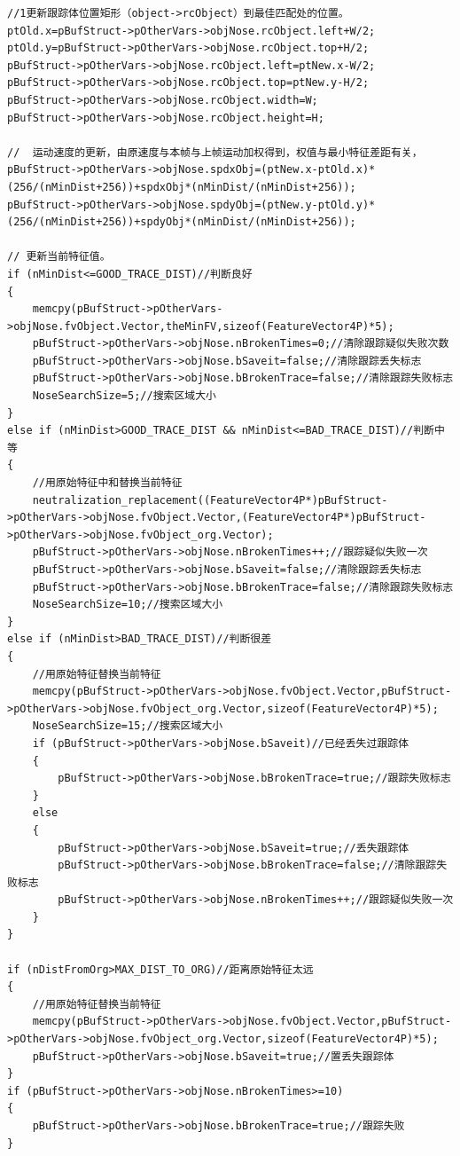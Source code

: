 \documentclass[12pt,hyperref,a4paper,UTF8]{ctexart}
\begin{document}
        \begin{lstlisting}[caption={更新}, label={lst:example}]
//1更新跟踪体位置矩形（object->rcObject）到最佳匹配处的位置。
ptOld.x=pBufStruct->pOtherVars->objNose.rcObject.left+W/2;
ptOld.y=pBufStruct->pOtherVars->objNose.rcObject.top+H/2;
pBufStruct->pOtherVars->objNose.rcObject.left=ptNew.x-W/2;
pBufStruct->pOtherVars->objNose.rcObject.top=ptNew.y-H/2;
pBufStruct->pOtherVars->objNose.rcObject.width=W;
pBufStruct->pOtherVars->objNose.rcObject.height=H;

// 	运动速度的更新，由原速度与本帧与上帧运动加权得到，权值与最小特征差距有关，
pBufStruct->pOtherVars->objNose.spdxObj=(ptNew.x-ptOld.x)*(256/(nMinDist+256))+spdxObj*(nMinDist/(nMinDist+256));
pBufStruct->pOtherVars->objNose.spdyObj=(ptNew.y-ptOld.y)*(256/(nMinDist+256))+spdyObj*(nMinDist/(nMinDist+256));

// 更新当前特征值。
if (nMinDist<=GOOD_TRACE_DIST)//判断良好
{
    memcpy(pBufStruct->pOtherVars->objNose.fvObject.Vector,theMinFV,sizeof(FeatureVector4P)*5);
    pBufStruct->pOtherVars->objNose.nBrokenTimes=0;//清除跟踪疑似失败次数
    pBufStruct->pOtherVars->objNose.bSaveit=false;//清除跟踪丢失标志
    pBufStruct->pOtherVars->objNose.bBrokenTrace=false;//清除跟踪失败标志
    NoseSearchSize=5;//搜索区域大小
}
else if (nMinDist>GOOD_TRACE_DIST && nMinDist<=BAD_TRACE_DIST)//判断中等
{	
    //用原始特征中和替换当前特征
    neutralization_replacement((FeatureVector4P*)pBufStruct->pOtherVars->objNose.fvObject.Vector,(FeatureVector4P*)pBufStruct->pOtherVars->objNose.fvObject_org.Vector);
    pBufStruct->pOtherVars->objNose.nBrokenTimes++;//跟踪疑似失败一次
    pBufStruct->pOtherVars->objNose.bSaveit=false;//清除跟踪丢失标志
    pBufStruct->pOtherVars->objNose.bBrokenTrace=false;//清除跟踪失败标志
    NoseSearchSize=10;//搜索区域大小
}
else if (nMinDist>BAD_TRACE_DIST)//判断很差
{
    //用原始特征替换当前特征
    memcpy(pBufStruct->pOtherVars->objNose.fvObject.Vector,pBufStruct->pOtherVars->objNose.fvObject_org.Vector,sizeof(FeatureVector4P)*5);
    NoseSearchSize=15;//搜索区域大小
    if (pBufStruct->pOtherVars->objNose.bSaveit)//已经丢失过跟踪体
    {
        pBufStruct->pOtherVars->objNose.bBrokenTrace=true;//跟踪失败标志
    }
    else
    {
        pBufStruct->pOtherVars->objNose.bSaveit=true;//丢失跟踪体
        pBufStruct->pOtherVars->objNose.bBrokenTrace=false;//清除跟踪失败标志
        pBufStruct->pOtherVars->objNose.nBrokenTimes++;//跟踪疑似失败一次
    }
}

if (nDistFromOrg>MAX_DIST_TO_ORG)//距离原始特征太远
{
    //用原始特征替换当前特征
    memcpy(pBufStruct->pOtherVars->objNose.fvObject.Vector,pBufStruct->pOtherVars->objNose.fvObject_org.Vector,sizeof(FeatureVector4P)*5);
    pBufStruct->pOtherVars->objNose.bSaveit=true;//置丢失跟踪体
}
if (pBufStruct->pOtherVars->objNose.nBrokenTimes>=10)
{
    pBufStruct->pOtherVars->objNose.bBrokenTrace=true;//跟踪失败
}
        \end{lstlisting}
\end{document}
